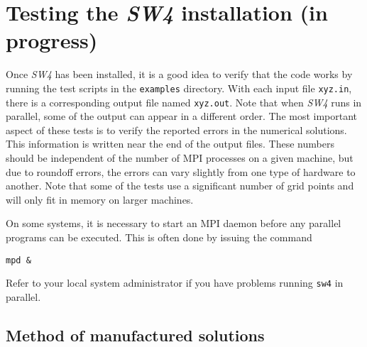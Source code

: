 \documentclass[11pt]{report}
\begin{document}

\chapter{Testing the \emph{SW4} installation (in progress)}\label{cha:testing-sw4}

Once \emph{SW4} has been installed, it is a good idea to verify that the code works by
running the test scripts in the \verb+examples+ directory. With each input file \verb+xyz.in+, there
is a corresponding output file named \verb+xyz.out+. Note that when \emph{SW4} runs in parallel,
some of the output can appear in a different order. The most important aspect of these tests is to
verify the reported errors in the numerical solutions. This information is written near the end of
the output files. These numbers should be independent of the number of MPI processes on a given
machine, but due to roundoff errors, the errors can vary slightly from one type of hardware to
another. Note that some of the tests use a significant number of grid points and will only fit in
memory on larger machines.

On some systems, it is necessary to start an MPI daemon before any parallel programs can be
executed. This is often done by issuing the command
\begin{verbatim}
mpd &
\end{verbatim}
Refer to your local system administrator if you have problems running \verb+sw4+ in parallel.

\section{Method of manufactured solutions}\label{sec:twilight}
\end{document}

